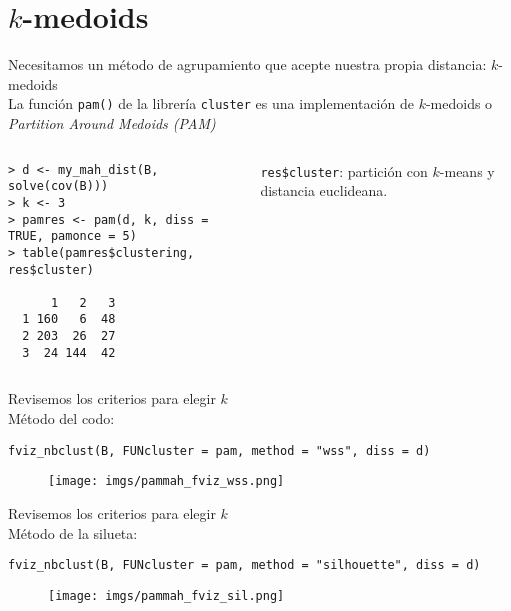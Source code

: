 \documentclass[10pt, aspectratio=169]{beamer}
\begin{document}
\section{$k$-medoids}

{
\begin{frame}[fragile]{}
\vspace{0.3cm}
Necesitamos un método de agrupamiento que acepte nuestra propia distancia: \alert{$k$-medoids}\\
\vspace{0.3cm}
\pause
La función \texttt{pam()} de la librería \texttt{cluster} es una implementación de $k$-medoids o \textit{Partition Around Medoids (PAM)}\pause
\begin{columns}
 \begin{verbatim}
> d <- my_mah_dist(B, solve(cov(B)))
> k <- 3
> pamres <- pam(d, k, diss = TRUE, pamonce = 5)
> table(pamres$clustering, res$cluster)
   
      1   2   3
  1 160   6  48
  2 203  26  27
  3  24 144  42
\end{verbatim}
\texttt{res\$cluster}: partición con $k$-means y distancia euclideana.
\end{columns}
\end{frame}
}

{
\begin{frame}[fragile]{}
\vspace{0.3cm}
Revisemos los criterios para elegir $k$\\
\vspace{0.3cm}
\textcolor{UltraViolet}{Método del codo:}
\begin{verbatim}
fviz_nbclust(B, FUNcluster = pam, method = "wss", diss = d) 
\end{verbatim}
\pause
\begin{figure}
 \texttt{[image: imgs/pammah\_fviz\_wss.png]}
\end{figure}
\end{frame}
}

{
\begin{frame}[fragile]{}
\vspace{0.3cm}
Revisemos los criterios para elegir $k$\\
\vspace{0.3cm}
\textcolor{UltraViolet}{Método de la silueta:}
\begin{verbatim}
fviz_nbclust(B, FUNcluster = pam, method = "silhouette", diss = d)
\end{verbatim}
\begin{figure}
 \texttt{[image: imgs/pammah\_fviz\_sil.png]}
\end{figure}
\end{frame}
}
\end{document}

